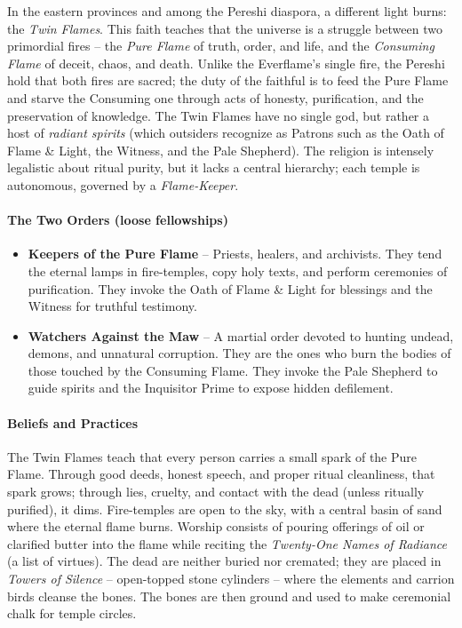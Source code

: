 In the eastern provinces and among the Pereshi diaspora, a different light burns: the \textit{Twin Flames}. This faith teaches that the universe is a struggle between two primordial fires -- the \textit{Pure Flame} of truth, order, and life, and the \textit{Consuming Flame} of deceit, chaos, and death. Unlike the Everflame's single fire, the Pereshi hold that both fires are sacred; the duty of the faithful is to feed the Pure Flame and starve the Consuming one through acts of honesty, purification, and the preservation of knowledge. The Twin Flames have no single god, but rather a host of \textit{radiant spirits} (which outsiders recognize as Patrons such as the Oath of Flame \& Light, the Witness, and the Pale Shepherd). The religion is intensely legalistic about ritual purity, but it lacks a central hierarchy; each temple is autonomous, governed by a \textit{Flame-Keeper}.

\paragraph{The Two Orders (loose fellowships)}
\begin{itemize}
  \item \textbf{Keepers of the Pure Flame} -- Priests, healers, and archivists. They tend the eternal lamps in fire-temples, copy holy texts, and perform ceremonies of purification. They invoke the Oath of Flame \& Light for blessings and the Witness for truthful testimony.
  \item \textbf{Watchers Against the Maw} -- A martial order devoted to hunting undead, demons, and unnatural corruption. They are the ones who burn the bodies of those touched by the Consuming Flame. They invoke the Pale Shepherd to guide spirits and the Inquisitor Prime to expose hidden defilement.
\end{itemize}

\paragraph{Beliefs and Practices}
The Twin Flames teach that every person carries a small spark of the Pure Flame. Through good deeds, honest speech, and proper ritual cleanliness, that spark grows; through lies, cruelty, and contact with the dead (unless ritually purified), it dims. Fire-temples are open to the sky, with a central basin of sand where the eternal flame burns. Worship consists of pouring offerings of oil or clarified butter into the flame while reciting the \textit{Twenty-One Names of Radiance} (a list of virtues). The dead are neither buried nor cremated; they are placed in \textit{Towers of Silence} -- open-topped stone cylinders -- where the elements and carrion birds cleanse the bones. The bones are then ground and used to make ceremonial chalk for temple circles.

